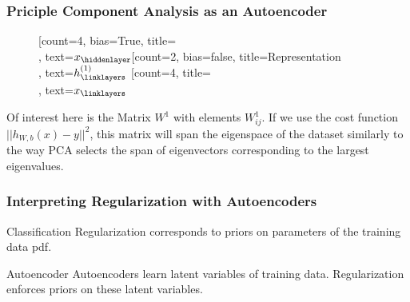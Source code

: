 \documentclass{beamer}
\begin{document}
\begin{frame}[fragile]
	\frametitle{Priciple Component Analysis as an Autoencoder}
	\begin{figure}[h!]
		\begin{neuralnetwork}[height=3, nodespacing=10mm, layerspacing=35mm]
		\newcommand{\x}[2]{$x_#2$}
		\newcommand{\y}[2]{$\hat{y}_#2$}
		\newcommand{\hfirst}[2]{\small $h^{(1)}_#2$}
		[count=4, bias=True, title=\\, text=\x]
		\hiddenlayer[count=2, bias=false, title=Representation\\, text=\hfirst] \linklayers
		\outputlayer[count=4, title=\\, text=\x] \linklayers
	    \end{neuralnetwork}
	\end{figure}

	\begin{scriptsize}
	Of interest here is the Matrix $ W^{1} $ with elements $W_{ij}^{1}$. If we use the cost function $||h_{W,b}(x) -y||^2$, this matrix will
	span the eigenspace of the dataset similarly to the way PCA selects the span of eigenvectors corresponding to
	the largest eigenvalues.
	\end{scriptsize}
\end{frame}


\begin{frame}
	\frametitle{Interpreting Regularization with Autoencoders}
	\begin{block}{Classification}
	Regularization corresponds to priors on parameters of the training data pdf.
	\end{block}

	\begin{block}{Autoencoder}
		Autoencoders learn latent variables of training data. Regularization enforces priors on these latent variables.
	\end{block}
\end{frame}
\end{document}
